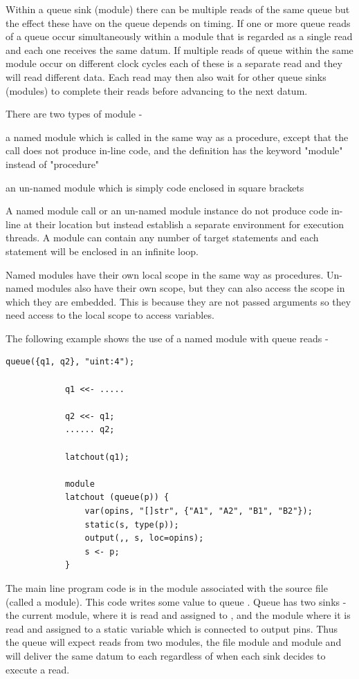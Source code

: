         Within a queue sink (module) there can be multiple reads of the same queue but
        the effect these have on the queue depends on timing. If one or more queue reads
        of a queue occur simultaneously within a module that is regarded as a single
        read and each one receives the same datum. If multiple reads of queue within the
        same module occur on different clock cycles each of these is a separate read
        and they will read different data. Each read may then also wait for other queue
        sinks (modules) to complete their reads before advancing to the next datum.

        There are two types of module -
        \blist
        \item   a named module which is called in the same way as a procedure,
                except that the call does not produce in-line code, and
                the definition has the keyword "module" instead of "procedure"
        \item   an un-named module which is simply code enclosed in square brackets
        \blend

        A named module call or an un-named module instance do not produce code
        in-line at their location but instead establish a separate environment for
        execution threads.
        A module can contain any number of target statements and each statement will be
        enclosed in an infinite loop.

        Named modules have their own local scope in the same way as procedures.
        Un-named modules also have their own scope, but they can also access the
        scope in which they are embedded. This is because they are not passed
        arguments so they need access to the local scope to access variables.

        The following example shows the use of a named module with queue reads -
        \pagebreak
        \begin{lstlisting}[language=threepl]
            queue({q1, q2}, "uint:4");

            q1 <<- .....

            q2 <<- q1;
            ...... q2;

            latchout(q1);

            module
            latchout (queue(p)) {
                var(opins, "[]str", {"A1", "A2", "B1", "B2"});
                static(s, type(p));
                output(,, s, loc=opins);
                s <- p;
            }
        \end{lstlisting}
        The main line program code is in the module associated with the source file
        (called a  module).
        This code writes some value to queue . Queue  has two
        sinks - the current module, where it is read and assigned to ,
        and the module  where it is read and assigned to a static
        variable which is connected to output pins. Thus the queue  will
        expect reads from two modules, the file module and module 
        and will deliver the same datum to each regardless of when each sink
        decides to execute a read.

